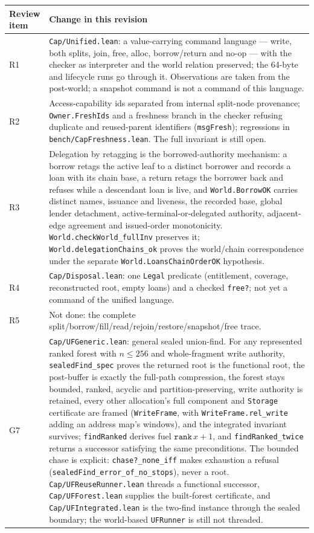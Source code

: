 \documentclass[10pt,a4paper]{article}
\newcommand{\file}[1]{\texttt{\small #1}}
\begin{document}
\begin{center}
\begin{tabular}{@{}lp{}@{}}
\toprule
Review item & Change in this revision \\
\midrule
R1 & \file{Cap/Unified.lean}: a value-carrying command language --- write, both splits, join, free, alloc, borrow/return and no-op --- with the checker as interpreter and the world relation preserved; the 64-byte and lifecycle runs go through it. Observations are taken from the post-world; a snapshot command is not a command of this language. \\
R2 & Access-capability ids separated from internal split-node provenance; \texttt{Owner.FreshIds} and a freshness branch in the checker refusing duplicate and reused-parent identifiers (\texttt{msgFresh}); regressions in \texttt{bench/CapFreshness.lean}. The full invariant is still open. \\
R3 & Delegation by retagging is the borrowed-authority mechanism: a borrow retags the active leaf to a distinct borrower and records a loan with its chain base, a return retags the borrower back and refuses while a descendant loan is live, and \texttt{World.BorrowOK} carries distinct names, issuance and liveness, the recorded base, global lender detachment, active-terminal-or-delegated authority, adjacent-edge agreement and issued-order monotonicity. \texttt{World.checkWorld\_fullInv} preserves it; \texttt{World.delegationChains\_ok} proves the world/chain correspondence under the separate \texttt{World.LoansChainOrderOK} hypothesis. \\
R4 & \file{Cap/Disposal.lean}: one \texttt{Legal} predicate (entitlement, coverage, reconstructed root, empty loans) and a checked \texttt{free?}; not yet a command of the unified language. \\
R5 & Not done: the complete split/borrow/fill/read/rejoin/restore/snapshot/free trace. \\
G7 & \file{Cap/UFGeneric.lean}: general sealed union-find. For any represented ranked forest with $n\le256$ and whole-fragment write authority, \texttt{sealedFind\_spec} proves the returned root is the functional root, the post-buffer is exactly the full-path compression, the forest stays bounded, ranked, acyclic and partition-preserving, write authority is retained, every other allocation's full component and \texttt{Storage} certificate are framed (\texttt{WriteFrame}, with \texttt{WriteFrame.rel\_write} adding an address map's windows), and the integrated invariant survives; \texttt{findRanked} derives fuel $\texttt{rank}\,x+1$, and \texttt{findRanked\_twice} returns a successor satisfying the same preconditions. The bounded chase is explicit: \texttt{chase?\_none\_iff} makes exhaustion a refusal (\texttt{sealedFind\_error\_of\_no\_stops}), never a root. \file{Cap/UFReuseRunner.lean} threads a functional successor, \file{Cap/UFForest.lean} supplies the built-forest certificate, and \file{Cap/UFIntegrated.lean} is the two-find instance through the sealed boundary; the world-based \texttt{UFRunner} is still not threaded. \\

\end{tabular}
\end{center}
\end{document}
